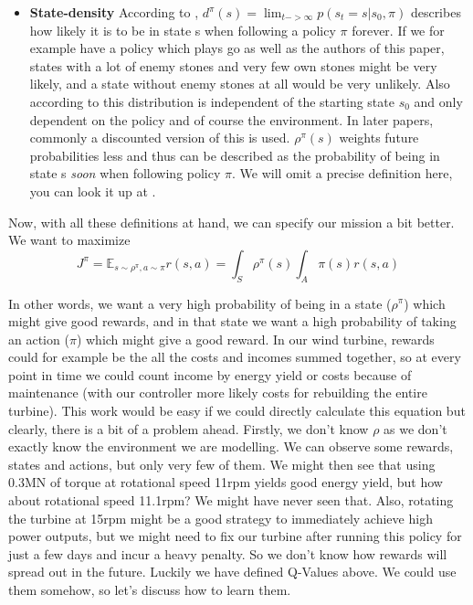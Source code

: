 \documentclass[hyperref,german,beleg]{cgvpub}
\begin{document}
\begin{itemize}
  \item \textbf{State-density} According to \cite{suttonPolicyGradientMethods}, $d^{\pi}(s) = \lim_{t -> \infty} p(s_t = s | s_0, \pi)$ describes how likely it is to be in state s when following a policy $\pi$ forever. If we for example have a policy which plays go as well as the authors of this paper, states with a lot of enemy stones and very few own stones might be very likely, and a state without enemy stones at all would be very unlikely. Also according to \cite{suttonPolicyGradientMethods} this distribution is independent of the starting state $s_0$ and only dependent on the policy and of course the environment. In later papers, commonly a discounted version of this is used. $\rho^{\pi}(s)$ weights future probabilities less and thus can be described as the probability of being in state s \textit{soon} when following policy $\pi$. We will omit a precise definition here, you can look it up at \cite[Section 2.1]{silverDeterministicPolicyGradient2013}.
\end{itemize}

Now, with all these definitions at hand, we can specify our mission a bit better. We want to maximize
\begin{equation}
J^{\pi} = \mathbb{E}_{s \sim \rho^{\pi}, a \sim \pi}r(s, a) = \int_S \rho^{\pi}(s) \int_A \pi(s) r(s, a)
\label{equ:maximize_rewards}
\end{equation}

In other words, we want a very high probability of being in a state ($\rho^{\pi}$) which might give good rewards, and in that state we want a high probability of taking an action ($\pi$) which might give a good reward. In our wind turbine, rewards could for example be the all the costs and incomes summed together, so at every point in time we could count income by energy yield or costs because of maintenance (with our controller more likely costs for rebuilding the entire turbine). This work would be easy if we could directly calculate this equation but clearly, there is a bit of a problem ahead. Firstly, we don't know $\rho$ as we don't exactly know the environment we are modelling. We can observe some rewards, states and actions, but only very few of them. We might then see that using 0.3MN of torque at rotational speed 11rpm yields good energy yield, but how about rotational speed 11.1rpm? We might have never seen that. Also, rotating the turbine at 15rpm might be a good strategy to immediately achieve high power outputs, but we might need to fix our turbine after running this policy for just a few days and incur a heavy penalty. So we don't know how rewards will spread out in the future. Luckily we have defined Q-Values above. We could use them somehow, so let's discuss how to learn them.
\end{document}
